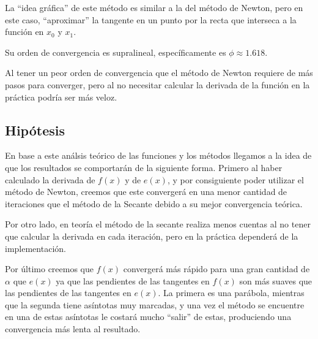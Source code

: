 La ``idea gráfica'' de este método es similar a la del método de Newton, pero en
este caso, ``aproximar'' la tangente en un punto por la recta que interseca a la
función en $x_0$ y $x_1$.

Su orden de convergencia es supralineal, específicamente es $\phi \approx
1.618$.

Al tener un peor orden de convergencia que el método de Newton requiere de más
pasos para converger, pero al no necesitar calcular la derivada de la función
en la práctica podría ser más veloz.

\subsection{Hipótesis}

En base a este análsis teórico de las funciones y los métodos llegamos a la
idea de que los resultados se comportarán de la siguiente forma. Primero al
haber calculado la derivada de $f(x)$ y de $e(x)$, y por consiguiente poder
utilizar el método de Newton, creemos que este convergerá en una menor cantidad
de iteraciones que el método de la Secante debido a su mejor convergencia
teórica.

Por otro lado, en teoría el método de la secante realiza menos cuentas al no
tener que calcular la derivada en cada iteración, pero en la práctica dependerá
de la implementación.

Por último creemos que $f(x)$ convergerá más rápido para una gran cantidad de
$\alpha$ que $e(x)$ ya que las pendientes de las tangentes en $f(x)$ son más
suaves que las pendientes de las tangentes en $e(x)$. La primera es una
parábola, mientras que la segunda tiene asíntotas muy marcadas, y una vez el
método se encuentre en una de estas asíntotas le costará mucho ``salir'' de
estas, produciendo una convergencia más lenta al resultado.
